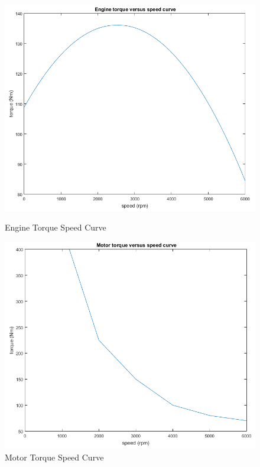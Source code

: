\begin{figure}[h]
\centering
\begin{minipage}{.52\textwidth}
 	\centering
	\includegraphics[scale=0.36]{figures/enginecurve}
	\caption{Engine Torque Speed Curve}
	\label{fig:engineTorqueSpeed}
\end{minipage}%
\begin{minipage}{.52\textwidth}
  	\centering
	\includegraphics[scale=0.37]{figures/motorcurve}
	\caption{Motor Torque Speed Curve}
	\label{fig:motorTorqueSpeed}
\end{minipage}
\end{figure}

